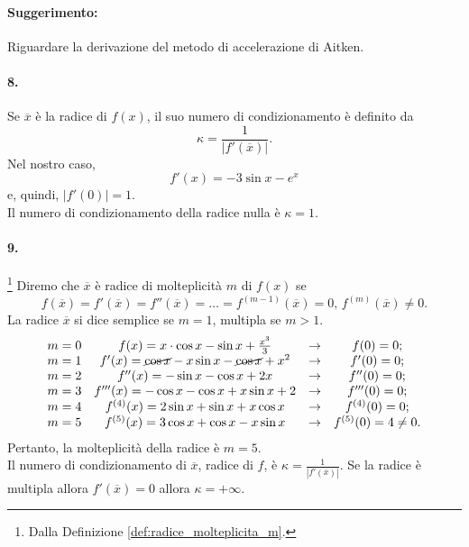 \paragraph{Suggerimento:} Riguardare la derivazione del metodo di accelerazione di Aitken.

\paragraph{8.} Se $\overline{x}$ è la radice di $f(x)$, il suo numero di condizionamento è definito da
\begin{equation*}
	\kappa = \frac{1}{|f'(\overline{x})|}.
\end{equation*}
Nel nostro caso,
\begin{equation*}
	f'(x)=-3\sin x - e^x
\end{equation*}
e, quindi, $|f'(0)|=1$.\\
Il numero di condizionamento della radice nulla è $\kappa=1$.

\paragraph{9.}\footnote{Dalla Definizione \ref{def:radice_molteplicita_m}.} Diremo che $\overline{x}$ è radice di molteplicità $m$ di $f(x)$ se
\begin{equation*}
	f(\overline{x})=f'(\overline{x})=f''(\overline{x})=\hdots=f^{(m-1)}(\overline{x})=0,\, f^{(m)}(\overline{x})\neq 0.
\end{equation*}
La radice $\overline{x}$ si dice semplice se $m=1$, multipla se $m>1$.
\begin{equation*}
	\begin{matrix}
		m=0 & f(x) = x\cdot\cos x-\sin x + \frac{x^3}{3} & \rightarrow & f(0)=0 ;\\
		m=1 & f'(x) = \cancel{\cos x} - x \sin x - \cancel{\cos x} + x^2 & \rightarrow & f'(0)=0 ;\\
		m=2 & f''(x) = -\sin x - \cos x + 2x & \rightarrow & f''(0)=0 ;\\
		m=3 & f'''(x) = -\cos x -\cos x + x\sin x  + 2 & \rightarrow & f'''(0)=0 ;\\
		m=4 & f^{(4)}(x) = 2\sin x + \sin x + x\cos x & \rightarrow & f^{(4)}(0)=0 ;\\
		m=5 & f^{(5)}(x) = 3\cos x + \cos x - x\sin x & \rightarrow & f^{(5)}(0)=4\neq 0 .
	\end{matrix}
\end{equation*}
Pertanto, la molteplicità della radice è $m=5$.\\
Il numero di condizionamento di $\overline{x}$, radice di $f$, è $\kappa = \frac{1}{|f'(\overline{x})|}$. Se la radice è multipla allora $f'(\overline{x})=0$ allora $\kappa=+\infty$.

